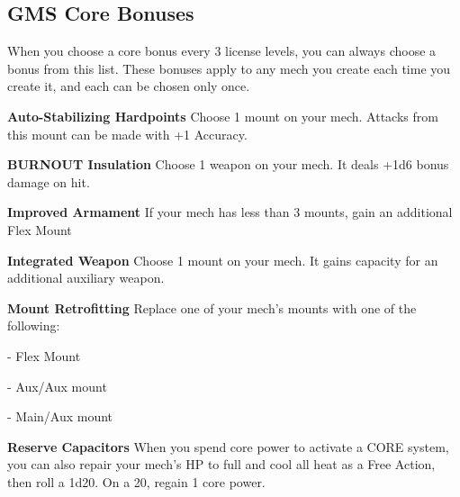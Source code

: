 \subsection{GMS Core Bonuses}
When you choose a core bonus every 3 license levels, you can always choose a bonus from this list. These bonuses apply to any mech you create each time you create it, and each can be chosen only once.


\textbf{Auto-Stabilizing Hardpoints}\newline
Choose 1 mount on your mech. Attacks from this mount can be made with +1 Accuracy.


\textbf{BURNOUT Insulation}\newline
Choose 1 weapon on your mech. It deals +1d6 bonus damage on hit.


\textbf{Improved Armament}\newline
If your mech has less than 3 mounts, gain an additional Flex Mount


\textbf{Integrated Weapon}\newline
Choose 1 mount on your mech. It gains capacity for an additional auxiliary weapon.


\textbf{Mount Retrofitting}\newline
Replace one of your mech's mounts with one of the following:

	       - Flex Mount

	       - Aux/Aux mount

	       - Main/Aux mount


\textbf{Reserve Capacitors}\newline
When you spend core power to activate a CORE system, you can also repair your mech's HP to full and cool all heat as a Free Action, then roll a 1d20. On a 20, regain 1 core power.

